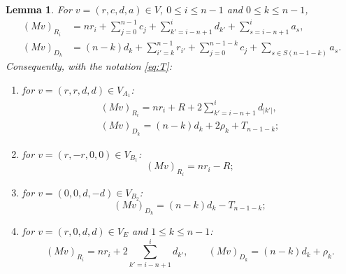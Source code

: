 \documentclass[11pt]{amsart}
\theoremstyle{plain}
\newtheorem{lemma}{Lemma}
\theoremstyle{definition}
\theoremstyle{remark}
\numberwithin{equation}{section}
\newcommand{\abs}[1]{\lvert #1\rvert}
\newcommand{\VA}{V_{A_1}}
\newcommand{\VBa}{V_{B_1}}
\newcommand{\VBb}{V_{B_2}}
\newcommand{\VE}{V_{E}}
\begin{document}
\begin{lemma}\label{lem:action}
For \(v=(r,c,d,a)\in V\), \(0\le i\le n-1\) and \(0\le k\le n-1\),
\begin{align}
(Mv)_{R_i}&=nr_i+\sum_{j=0}^{n-1}c_j+\sum_{k'=i-n+1}^{i}d_{k'}
+\sum_{s=i-n+1}^{i}a_s,\label{eq:Mrow}\\
(Mv)_{D_k}&=(n-k)d_k+\sum_{i'=k}^{n-1}r_{i'}+\sum_{j=0}^{n-1-k}c_j
+\sum_{s\in S(n-1-k)}a_s.\label{eq:Mdiag}
\end{align}
Consequently, with the notation \eqref{eq:T}:
\begin{enumerate}
\item[(i)] for \(v=(r,r,d,d)\in\VA\):
\begin{equation}\label{eq:actA}
\begin{gathered}
(Mv)_{R_i}=nr_i+R+2\sum_{k'=i-n+1}^{i}d_{\abs{k'}},\\
(Mv)_{D_k}=(n-k)d_k+2\rho_k+T_{n-1-k};
\end{gathered}
\end{equation}
\item[(ii)] for \(v=(r,-r,0,0)\in\VBa\):
\begin{equation}\label{eq:actB1}
(Mv)_{R_i}=nr_i-R;
\end{equation}
\item[(iii)] for \(v=(0,0,d,-d)\in\VBb\):
\begin{equation}\label{eq:actB2}
(Mv)_{D_k}=(n-k)d_k-T_{n-1-k};
\end{equation}
\item[(iv)] for \(v=(r,0,d,d)\in\VE\) and \(1\le k\le n-1\):
\begin{equation}\label{eq:actE}
(Mv)_{R_i}=nr_i+2\sum_{k'=i-n+1}^{i}d_{k'},\qquad (Mv)_{D_k}=(n-k)d_k+\rho_k.
\end{equation}
\end{enumerate}
\end{lemma}
\end{document}
